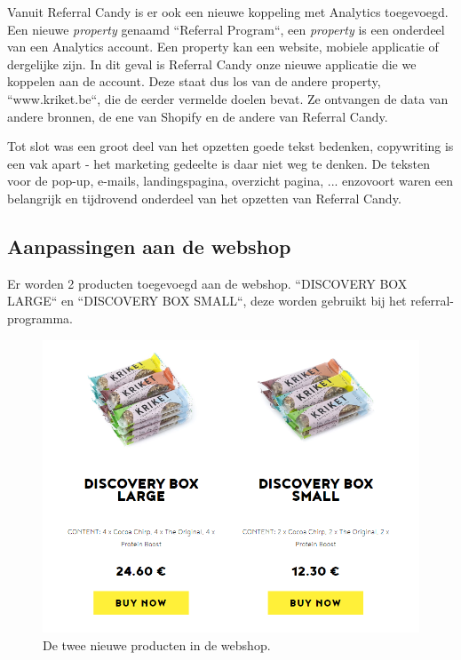 Vanuit Referral Candy is er ook een nieuwe koppeling met Analytics toegevoegd. Een nieuwe \emph{property} genaamd ``Referral Program``, een \emph{property} is een onderdeel van een Analytics account. Een property kan een website, mobiele applicatie of dergelijke zijn. In dit geval is Referral Candy onze nieuwe applicatie die we koppelen aan de account. Deze staat dus los van de andere property, ``www.kriket.be``, die de eerder vermelde doelen bevat. Ze ontvangen de data van andere bronnen, de ene van Shopify en de andere van Referral Candy.

Tot slot was een groot deel van het opzetten goede tekst bedenken, copywriting is een vak apart - het marketing gedeelte is daar niet weg te denken. De teksten voor de pop-up, e-mails, landingspagina, overzicht pagina, ... enzovoort waren een belangrijk en tijdrovend onderdeel van het opzetten van Referral Candy. 

\subsection{Aanpassingen aan de webshop} \label{sec:aanpassingen-webshop}
Er worden 2 producten toegevoegd aan de webshop. ``DISCOVERY BOX LARGE`` en ``DISCOVERY BOX SMALL``, deze worden gebruikt bij het referral-programma.

\begin{figure}[h!]
	\includegraphics[width=\linewidth]{img/discovery-box-webshop.png}
	\caption{De twee nieuwe producten in de webshop.}
	\label{fig:discovery-box-webshop}
\end{figure}

